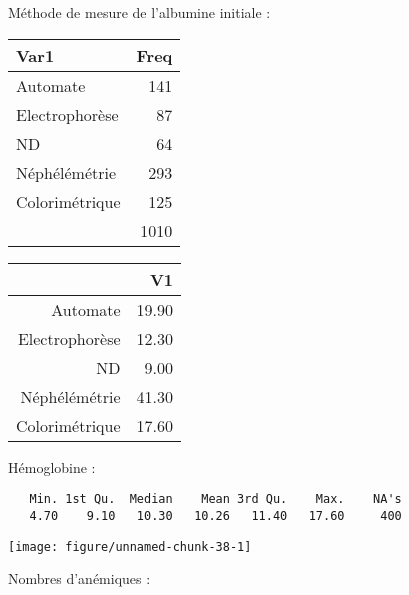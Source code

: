 \documentclass[11pt,a4paper]{article}\usepackage[]{graphicx}\usepackage[]{color}
\makeatletter
\def\maxwidth{ %
  \ifdim\Gin@nat@width>\linewidth
    \linewidth
  \else
    \Gin@nat@width
  \fi
}
\newenvironment{kframe}{%
 \def\at@end@of@kframe{}%
 \ifinner\ifhmode%
  \def\at@end@of@kframe{\end{minipage}}%
  \begin{minipage}{\columnwidth}%
 \fi\fi%
 \def\FrameCommand##1{\hskip\@totalleftmargin \hskip-\fboxsep
 \colorbox{shadecolor}{##1}\hskip-\fboxsep
     \hskip-\linewidth \hskip-\@totalleftmargin \hskip\columnwidth}%
 \MakeFramed {\advance\hsize-\width
   \@totalleftmargin\z@ \linewidth\hsize
   \@setminipage}}%
 {\par\unskip\endMakeFramed%
 \at@end@of@kframe}
\newenvironment{knitrout}{}{} %
\makeatother
\begin{document}
Méthode de mesure de l'albumine initiale :

\begin{table}[H]
\centering
\begin{tabular}{lr}
  \hline
Var1 & Freq \\ 
  \hline
Automate & 141 \\ 
  Electrophorèse &  87 \\ 
  ND &  64 \\ 
  Néphélémétrie & 293 \\ 
  Colorimétrique  & 125 \\ 
   & 1010 \\ 
   \hline
\end{tabular}
\end{table}
\begin{table}[H]
\centering
\begin{tabular}{rr}
  \hline
 & V1 \\ 
  \hline
Automate & 19.90 \\ 
  Electrophorèse & 12.30 \\ 
  ND & 9.00 \\ 
  Néphélémétrie & 41.30 \\ 
  Colorimétrique  & 17.60 \\ 
   \hline
\end{tabular}
\end{table}


Hémoglobine :

\begin{knitrout}
\color{fgcolor}\begin{kframe}
\begin{verbatim}
   Min. 1st Qu.  Median    Mean 3rd Qu.    Max.    NA's 
   4.70    9.10   10.30   10.26   11.40   17.60     400 
\end{verbatim}
\end{kframe}
\texttt{[image: figure/unnamed-chunk-38-1]} 

\end{knitrout}

Nombres d'anémiques :
\end{document}
